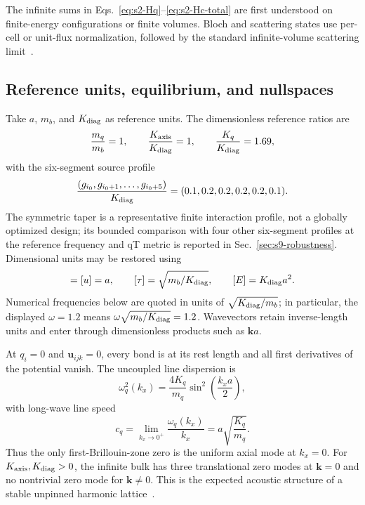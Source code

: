\documentclass[10pt,aps,pre,reprint,floatfix,notitlepage,nofootinbib]{revtex4-2}
\newcommand{\vk}{\bm{k}}
\newcommand{\vu}{\bm{u}}
\begin{document}
The infinite sums in Eqs.~\eqref{eq:s2-Hq}--\eqref{eq:s2-Hc-total} are first understood on finite-energy configurations or finite volumes. Bloch and scattering states use per-cell or unit-flux normalization, followed by the standard infinite-volume scattering limit~\cite{Ong2018,Sadasivam2017,Khodavirdi2024}.

\subsection{Reference units, equilibrium, and nullspaces}
\label{sec:s2-units-nullspaces}

Take $a$, $m_b$, and $K_{\rm diag}$ as reference units. The dimensionless reference ratios are
\begin{equation}
  \frac{m_q}{m_b}=1,
  \qquad
  \frac{K_{\rm axis}}{K_{\rm diag}}=1,
  \qquad
  \frac{K_q}{K_{\rm diag}}=1.69,
  \label{eq:s2-ratios}
\end{equation}
with the six-segment source profile
\begin{equation}
  \frac{(g_{i_0},g_{i_0+1},\ldots,g_{i_0+5})}{K_{\rm diag}}
  =(0.1,0.2,0.2,0.2,0.2,0.1).
  \label{eq:s2-g-profile}
\end{equation}
The symmetric taper is a representative finite interaction profile, not a globally optimized design; its bounded comparison with four other six-segment profiles at the reference frequency and qT metric is reported in Sec.~\ref{sec:s9-robustness}. Dimensional units may be restored using
\begin{equation}
  [q]=[u]=a,
  \qquad
  [\tau]=\sqrt{m_b/K_{\rm diag}},
  \qquad
  [E]=K_{\rm diag}a^2.
  \label{eq:s2-units}
\end{equation}
Numerical frequencies below are quoted in units of $\sqrt{K_{\rm diag}/m_b}$; in particular, the displayed $\omega=1.2$ means $\omega\sqrt{m_b/K_{\rm diag}}=1.2$. Wavevectors retain inverse-length units and enter through dimensionless products such as $\vk a$.

At $q_i=0$ and $\vu_{ijk}=0$, every bond is at its rest length and all first derivatives of the potential vanish. The uncoupled line dispersion is
\begin{equation}
  \omega_q^2(k_x)
  =\frac{4K_q}{m_q}
   \sin^2\!\left(\frac{k_xa}{2}\right),
  \label{eq:s2-line-dispersion}
\end{equation}
with long-wave line speed
\begin{equation}
  c_q=\lim_{k_x\to0^+}\frac{\omega_q(k_x)}{k_x}
  =a\sqrt{\frac{K_q}{m_q}}.
  \label{eq:s2-line-speed}
\end{equation}
Thus the only first-Brillouin-zone zero is the uniform axial mode at $k_x=0$. For $K_{\rm axis},K_{\rm diag}>0$, the infinite bulk has three translational zero modes at $\vk=0$ and no nontrivial zero mode for $\vk\ne0$. This is the expected acoustic structure of a stable unpinned harmonic lattice~\cite{BornHuang1954,Maradudin1971}.
\end{document}
